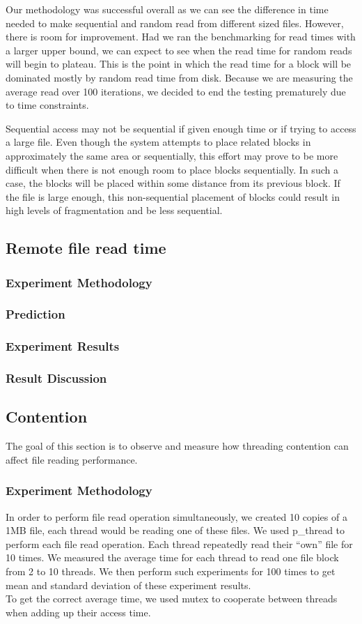 \documentclass{article} %
\begin{document}
Our methodology was successful overall as we can see the difference in time needed to make sequential and random read from different sized files. However, there is room for improvement. Had we ran the benchmarking for read times with a larger upper bound, we can expect to see when the read time for random reads will begin to plateau. This is the point in which the read time for a block will be dominated mostly by random read time from disk. Because we are measuring the average read over 100 iterations, we decided to end the testing prematurely due to time constraints.

Sequential access may not be sequential if given enough time or if trying to access a large file. Even though the system attempts to place related blocks in approximately the same area or sequentially, this effort may prove to be more difficult when there is not enough room to place blocks sequentially. In such a case, the blocks will be placed within some distance from its previous block. If the file is large enough, this non-sequential placement of blocks could result in high levels of fragmentation and be less sequential.

\subsection{Remote file read time}

\subsubsection{Experiment Methodology}
\subsubsection{Prediction}
\subsubsection{Experiment Results}
\subsubsection{Result Discussion}

\subsection{Contention}
The goal of this section is to observe and measure how threading contention can affect file reading performance. 
\subsubsection{Experiment Methodology}
In order to perform file read operation simultaneously, we created 10 copies of a 1MB file, each thread would be reading one of these files. We used p\_thread to perform each file read operation. Each thread repeatedly read their ``own'' file for 10 times. We measured the average time for each thread to read one file block from 2 to 10 threads. We then perform such experiments for 100 times to get mean and standard deviation of these experiment results.\\
To get the correct average time, we used mutex to cooperate between threads when adding up their access time.\\
\end{document}
